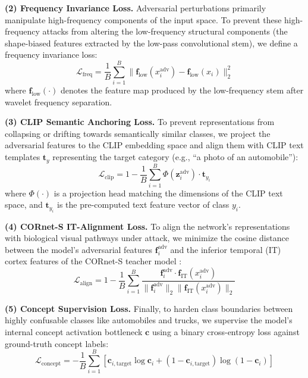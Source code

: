 \documentclass[12pt,a4paper]{article}
\begin{document}
\textbf{(2) Frequency Invariance Loss.} Adversarial perturbations primarily manipulate high-frequency components of the input space. To prevent these high-frequency attacks from altering the low-frequency structural components (the shape-biased features extracted by the low-pass convolutional stem), we define a frequency invariance loss:
\begin{equation}
\mathcal{L}_{\text{freq}} = \frac{1}{B} \sum_{i=1}^{B} \|\mathbf{f}_{\text{low}}(x_{i}^{\text{adv}}) - \mathbf{f}_{\text{low}}(x_i) \|_2^2
\label{eq:freq}
\end{equation}
where $\mathbf{f}_{\text{low}}(\cdot)$ denotes the feature map produced by the low-frequency stem after wavelet frequency separation.

\textbf{(3) CLIP Semantic Anchoring Loss.} To prevent representations from collapsing or drifting towards semantically similar classes, we project the adversarial features to the CLIP embedding space and align them with CLIP text templates $\mathbf{t}_y$ representing the target category (e.g., ``a photo of an automobile''):
\begin{equation}
\mathcal{L}_{\text{clip}} = 1 - \frac{1}{B} \sum_{i=1}^{B} \Phi(\mathbf{z}_i^{\text{adv}}) \cdot \mathbf{t}_{y_i}
\label{eq:clip}
\end{equation}
where $\Phi(\cdot)$ is a projection head matching the dimensions of the CLIP text space, and $\mathbf{t}_{y_i}$ is the pre-computed text feature vector of class $y_i$.

\textbf{(4) CORnet-S IT-Alignment Loss.} To align the network's representations with biological visual pathways under attack, we minimize the cosine distance between the model's adversarial features $\mathbf{f}_i^{\text{adv}}$ and the inferior temporal (IT) cortex features of the CORnet-S teacher model \citep{kubilius2019brain}:
\begin{equation}
\mathcal{L}_{\text{align}} = 1 - \frac{1}{B} \sum_{i=1}^{B} \frac{\mathbf{f}_i^{\text{adv}} \cdot \mathbf{f}_{\text{IT}}(x_i^{\text{adv}})}{\|\mathbf{f}_i^{\text{adv}}\|_2 \|\mathbf{f}_{\text{IT}}(x_i^{\text{adv}})\|_2}
\label{eq:align}
\end{equation}

\textbf{(5) Concept Supervision Loss.} Finally, to harden class boundaries between highly confusable classes like automobiles and trucks, we supervise the model's internal concept activation bottleneck $\mathbf{c}$ using a binary cross-entropy loss against ground-truth concept labels:
\begin{equation}
\mathcal{L}_{\text{concept}} = -\frac{1}{B} \sum_{i=1}^{B} \left[ \mathbf{c}_{i, \text{target}} \log \mathbf{c}_i + (1 - \mathbf{c}_{i, \text{target}}) \log (1 - \mathbf{c}_i) \right]
\label{eq:concept}
\end{equation}
\end{document}
